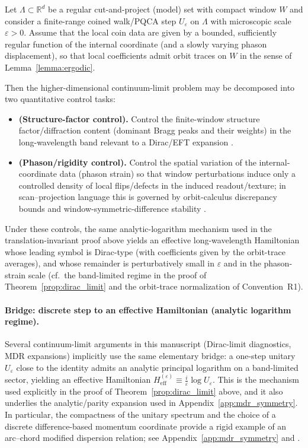 \begin{proposition}
\label{prop:quasicrystal_homogenization_reduction}
Let $\Lambda\subset\mathbb{R}^d$ be a regular cut-and-project (model) set with compact window $W$ and consider a finite-range coined walk/PQCA step $U_\varepsilon$ on $\Lambda$ with microscopic scale $\varepsilon>0$.
Assume that the local coin data are given by a bounded, sufficiently regular function of the internal coordinate (and a slowly varying phason displacement), so that local coefficients admit orbit traces on $W$ in the sense of Lemma~\ref{lemma:ergodic}.\par
\noindent
Then the higher-dimensional continuum-limit problem may be decomposed into two quantitative control tasks:
\begin{itemize}
    \item \textbf{(Structure-factor control).} Control the finite-window structure factor/diffraction content (dominant Bragg peaks and their weights) in the long-wavelength band relevant to a Dirac/EFT expansion \cite{Hof1995,BaakeGrimm2013AperiodicOrder}.
    \item \textbf{(Phason/rigidity control).} Control the spatial variation of the internal-coordinate data (phason strain) so that window perturbations induce only a controlled density of local flips/defects in the induced readout/texture; in scan--projection language this is governed by orbit-calculus discrepancy bounds and window-symmetric-difference stability \cite{Ma2025HPA}.
\end{itemize}
Under these controls, the same analytic-logarithm mechanism used in the translation-invariant proof above yields an effective long-wavelength Hamiltonian whose leading symbol is Dirac-type (with coefficients given by the orbit-trace averages), and whose remainder is perturbatively small in $\varepsilon$ and in the phason-strain scale (cf.\ the band-limited regime in the proof of Theorem~\ref{prop:dirac_limit} and the orbit-trace normalization of Convention~R1).\par
\end{proposition}

\paragraph{Bridge: discrete step to an effective Hamiltonian (analytic logarithm regime).}
Several continuum-limit arguments in this manuscript (Dirac-limit diagnostics, MDR expansions) implicitly use the same elementary bridge: a one-step unitary $U_\varepsilon$ close to the identity admits an analytic principal logarithm on a band-limited sector, yielding an effective Hamiltonian $H_{\mathrm{eff}}^{(\varepsilon)}\equiv \frac{i}{\varepsilon}\log U_\varepsilon$.
This is the mechanism used explicitly in the proof of Theorem~\ref{prop:dirac_limit} above, and it also underlies the analytic/parity expansion used in Appendix~\ref{app:mdr_symmetry}.
In particular, the compactness of the unitary spectrum and the choice of a discrete difference-based momentum coordinate provide a rigid example of an arc--chord modified dispersion relation; see Appendix~\ref{app:mdr_symmetry} and \cite{Ma2025HPA}.


